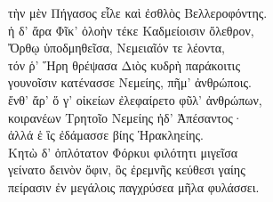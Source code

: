 \begin{pages}
\begin{Leftside}
τὴν μὲν Πήγασος εἷλε καὶ ἐσθλὸς Βελλεροφόντης. \\
ἡ δ' ἄρα Φῖκ' ὀλοὴν τέκε Καδμείοισιν ὄλεθρον,\\
Ὄρθῳ ὑποδμηθεῖσα, Νεμειαῖόν τε λέοντα, \\
τόν ῥ' Ἥρη θρέψασα Διὸς κυδρὴ παράκοιτις\\
γουνοῖσιν κατένασσε Νεμείης, πῆμ' ἀνθρώποις.\\
ἔνθ' ἄρ' ὅ γ' οἰκείων ἐλεφαίρετο φῦλ' ἀνθρώπων, \\
κοιρανέων Τρητοῖο Νεμείης ἠδ' Ἀπέσαντος· \\
ἀλλά ἑ ἲς ἐδάμασσε βίης Ἡρακληείης.\\

\quad{}Κητὼ δ' ὁπλότατον Φόρκυι φιλότητι μιγεῖσα\\
γείνατο δεινὸν ὄφιν, ὃς ἐρεμνῆς κεύθεσι γαίης\\
πείρασιν ἐν μεγάλοις παγχρύσεα μῆλα φυλάσσει. \\

\smallskip
\begin{center}\end{center}
\smallskip


\end{Leftside}
\end{pages}
